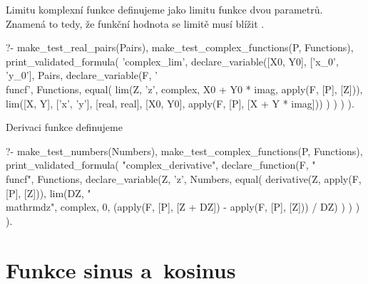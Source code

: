 Limitu komplexní funkce definujeme jako limitu funkce dvou parametrů. Znamená to tedy, že funkční hodnota se limitě musí blížit .

\begin{prolog}
?-	make_test_real_pairs(Pairs),
	make_test_complex_functions(P, Functions),
	print_validated_formula(
		'complex_lim',
		declare_variable([X0, Y0], ['x_0', 'y_0'], Pairs,
			declare_variable(F, '\\func{f}', Functions,
				equal(
					lim(Z, 'z', complex, X0 + Y0 * imag, apply(F, [P], [Z])),
					lim([X, Y], ['x', 'y'], [real, real], [X0, Y0], apply(F, [P], [X + Y * imag]))
				)
			)
		)
	).
\end{prolog}

Derivaci funkce definujeme 

\begin{prolog}
?-	make_test_numbers(Numbers),
	make_test_complex_functions(P, Functions),
	print_validated_formula(
		"complex_derivative",
		declare_function(F, "\\func{f}", Functions,
			declare_variable(Z, 'z', Numbers,
				equal(
					derivative(Z, apply(F, [P], [Z])),
					lim(DZ, "\\mathrm{d}z", complex, 0, (apply(F, [P], [Z + DZ]) - apply(F, [P], [Z])) / DZ)
				)
			)
		)
	).
\end{prolog}

\section{Funkce sinus a~kosinus}
